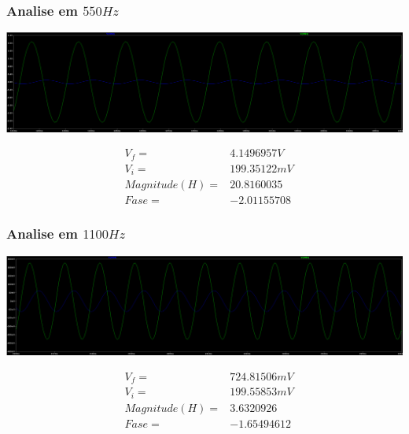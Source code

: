 \documentclass[12pt,twoside, a4paper, twocolumn]{article}
\begin{document}
\subsubsection{Analise em $550Hz$}


\begin{adjustbox}{scale=0.09}
    \includegraphics{ltfreq550.png}
\end{adjustbox}


\begin{equation*}
    \begin{aligned}
         & V_f =          & 4.1496957V  \\
         & V_i =          & 199.35122mV \\
         & Magnitude(H) = & 20.8160035  \\
         & Fase =         & -2.01155708
    \end{aligned}
\end{equation*}


\subsubsection{Analise em $1100Hz$}


\begin{adjustbox}{scale=0.09}
    \includegraphics{ltfreq1100.png}
\end{adjustbox}


\begin{equation*}
    \begin{aligned}
         & V_f =          & 724.81506mV \\
         & V_i =          & 199.55853mV \\
         & Magnitude(H) = & 3.6320926   \\
         & Fase =         & -1.65494612
    \end{aligned}
\end{equation*}
\end{document}
